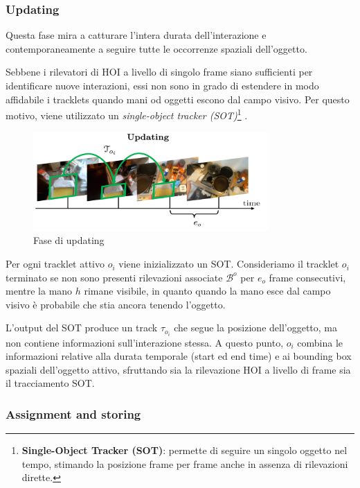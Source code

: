 \subsubsection*{Updating}

Questa fase mira a catturare l'intera durata dell'interazione e contemporaneamente a seguire tutte le occorrenze spaziali dell'oggetto.

Sebbene i rilevatori di HOI a livello di singolo frame siano sufficienti per identificare nuove interazioni, essi non sono in grado di estendere in modo affidabile i tracklets quando mani od oggetti escono dal campo visivo. Per questo motivo, viene utilizzato un \emph{single-object tracker (SOT)}\footnote{\textbf{Single-Object Tracker (SOT)}: permette di seguire un singolo oggetto nel tempo, stimando la posizione frame per frame anche in assenza di rilevazioni dirette.} \cite{tang2023egotrackslongtermegocentricvisual}.  

\begin{figure}[ht]
    \centering
    \includegraphics[width=0.8\textwidth]{Images/update.png}
    \caption{Fase di updating}
    \label{fig:update}
\end{figure}

Per ogni tracklet attivo $o_i$ viene inizializzato un SOT. Consideriamo il tracklet $o_i$ terminato se non sono presenti rilevazioni associate $\mathcal{B}^o$ per $e_o$ frame consecutivi, mentre la mano $h$ rimane visibile, in quanto quando la mano esce dal campo visivo è probabile che stia ancora tenendo l'oggetto.

L'output del SOT produce un track $\tau_{o_i}$ che segue la posizione dell'oggetto, ma non contiene informazioni sull'interazione stessa. A questo punto, $o_i$ combina le informazioni relative alla durata temporale (start ed end time) e ai bounding box spaziali dell'oggetto attivo, sfruttando sia la rilevazione HOI a livello di frame sia il tracciamento SOT.

\subsubsection*{Assignment and storing}

